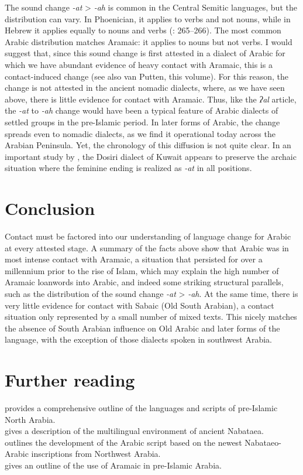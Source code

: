 \documentclass[output=paper]{langsci/langscibook}
\begin{document}
The sound change \textit{-at} > \textit{-ah} is common in the Central Semitic languages, but the distribution can vary. In Phoenician, it applies to verbs and not nouns, while in Hebrew it applies equally to nouns and verbs (\citealt{HuehnergardRubin2011}: 265--266). The most common Arabic distribution matches Aramaic: it applies to nouns but not verbs. I would suggest that, since this sound change is first attested in a dialect of Arabic for which we have abundant evidence of heavy contact with Aramaic, this is a contact-induced change (see also van Putten, this volume). For this reason, the change is not attested in the ancient nomadic dialects, where, as we have seen above, there is little evidence for contact with Aramaic. Thus, like the \textit{ʔal} article, the \textit{-at} to \textit{-ah} change would have been a typical feature of Arabic dialects of settled groups in the pre-Islamic period. In later forms of Arabic, the change spreads even to nomadic dialects, as we find it operational today across the Arabian Peninsula. Yet, the chronology of this diffusion is not quite clear. In an important study by \citet{vanPutten2017}, the Dosiri dialect of Kuwait appears to preserve the archaic situation where the feminine ending is realized as \textit{-at} in all positions.

\section{Conclusion}
Contact must be factored into our understanding of language change for Arabic at every attested stage. A summary of the facts above show that Arabic was in most intense contact with Aramaic, a situation that persisted for over a millennium prior to the rise of Islam, which may explain the high number of Aramaic loanwords into Arabic, and indeed some striking structural parallels, such as the distribution of the sound change \textit{-at} > \textit{-ah}. At the same time, there is very little evidence for contact with Sabaic (Old South Arabian), a contact situation only represented by a small number of mixed texts.  This nicely matches the absence of South Arabian influence on Old Arabic and later forms of the language, with the exception of those dialects spoken in southwest Arabia.

\section*{Further reading}
\citet{Al-Jallad2018ANA} provides a comprehensive outline of the languages and scripts of pre-Islamic North Arabia.\\
\citet{Macdonald2003} gives a description of the multilingual environment of ancient Nabataea. \\
\citet{Nehmé2010} outlines the development of the Arabic script based on the newest Nabataeo-Arabic inscriptions from Northwest Arabia.\\
\citet{Stein2018} gives an outline of the use of Aramaic in pre-Islamic Arabia.\\
\end{document}
